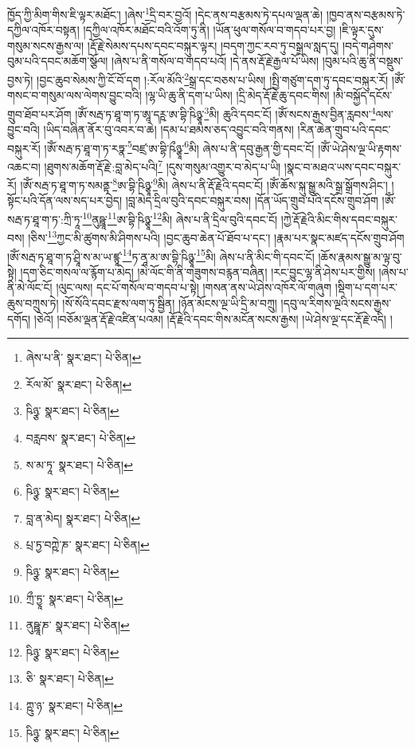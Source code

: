 ཁྱོད་ཀྱི་མིག་གིས་ཇི་ལྟར་མཐོང་། །ཞེས་\footnote{ཞེས་པ་ནི་  སྣར་ཐང་།  པེ་ཅིན། }དྲི་བར་བྱའོ། །དེང་ནས་བརྩམས་ཏེ་དཔལ་ལྡན་ཆེ། །ཁྱབ་ནས་བརྩམས་ཏེ་དཀྱིལ་འཁོར་བསྟན། །དཀྱིལ་འཁོར་མཐོང་བའི་འོག་ཏུ་ནི། །ཡོན་ཕུལ་གསོལ་བ་གདབ་པར་བྱ། །ཇི་ལྟར་དུས་གསུམ་སངས་རྒྱས་ལ། །རྡོ་རྗེ་སེམས་དཔས་དབང་བསྐུར་ལྟར། །བདག་ཀྱང་རབ་ཏུ་བསྒྲལ་སླད་དུ། །བདེ་གཤེགས་བུམ་པའི་དབང་མཆོག་སྩོལ། །ཞེས་པ་ནི་གསོལ་བ་གདབ་པའོ། །དེ་ནས་རྡོ་རྗེ་རྒྱལ་པོ་ཡིས། །བུམ་པའི་ཆུ་ནི་བསྡུས་བྱས་ཏེ། །བྱང་ཆུབ་སེམས་ཀྱི་ངོ་བོ་དག །:རོལ་མོའི་\footnote{རོལ་མོ་  སྣར་ཐང་།  པེ་ཅིན། }སྒྲ་དང་བཅས་པ་ཡིས། །སྤྱི་གཙུག་དག་ཏུ་དབང་བསྐུར་རོ། །ཨོཾ་གསང་བ་གསུམ་ལས་ལེགས་བྱུང་བའི། །ལྷ་ཡི་ཆུ་ནི་དག་པ་ཡིས། །དྲི་མེད་རྡོ་རྗེ་ཆུ་དབང་གིས། །མི་བསྐྱོད་དངོས་གྲུབ་ཐོབ་པར་ཤོག །ཨོཾ་སརྦ་ཏ་ཐཱ་ག་ཏ་ཨཱ་དཪྵ་ཨ་བྷི་ཥིཉྩཱ་\footnote{ཥིཉྩ་  སྣར་ཐང་།  པེ་ཅིན། }མི། ཆུའི་དབང་ངོ། །ཨོཾ་སངས་རྒྱས་བྱིན་རླབས་\footnote{བརླབས་  སྣར་ཐང་།  པེ་ཅིན། }ལས་བྱུང་བའི། །ཡིད་བཞིན་ནོར་བུ་འབར་བ་ཆེ། །དམ་པ་ཐམས་ཅད་འབྱུང་བའི་གནས། །རིན་ཆེན་གྲུབ་པའི་དབང་བསྐུར་རོ། །ཨོཾ་སརྦ་ཏ་ཐཱ་ག་ཏ་རཏྣ་\footnote{ས་མ་ཏཱ་  སྣར་ཐང་།  པེ་ཅིན། }བཛྲ་ཨ་བྷི་ཥྀཉྩཱ་\footnote{ཥིཉྩ་  སྣར་ཐང་།  པེ་ཅིན། }མི། ཞེས་པ་ནི་དབུ་རྒྱན་གྱི་དབང་ངོ། །ཨོཾ་ཡེ་ཤེས་ལྔ་ཡི་རྟགས་འཆང་བ། །ཐུགས་མཆོག་རྡོ་རྗེ་:བླ་མེད་པའི།\footnote{བླ་ན་མེད།  སྣར་ཐང་།  པེ་ཅིན། } །དུས་གསུམ་འགྱུར་བ་མེད་པ་ཡི། །སྣང་བ་མཐའ་ཡས་དབང་བསྐུར་རོ། །ཨོཾ་སརྦ་ཏ་ཐཱ་ག་ཏ་སམནྟ་\footnote{པྲ་ཏྱ་བཀྵེ་ཎ་  སྣར་ཐང་།  པེ་ཅིན། }ཨ་བྷི་ཥིཉྩཱ་\footnote{ཥིཉྩ་  སྣར་ཐང་།  པེ་ཅིན། }མི། ཞེས་པ་ནི་རྡོ་རྗེའི་དབང་ངོ། །ཨོཾ་ཆོས་སྐུ་སྒྱུ་མའི་སྒྲ་སྒྲོགས་ཤིང་། །སྟོང་པའི་དོན་ལས་སད་པར་བྱེད། །བླ་མེད་དྲིལ་བུའི་དབང་བསྐུར་བས། །དོན་ཡོད་གྲུབ་པའི་དངོས་གྲུབ་ཤོག །ཨོཾ་སརྦ་ཏ་ཐཱ་ག་ཏ་:ཀྲི་ཏཱ་\footnote{ཀྲྀ་ཏྱཱ་  སྣར་ཐང་།  པེ་ཅིན། }ནུཥྛཱ་\footnote{ནུཥྛཱ་ཎ་  སྣར་ཐང་།  པེ་ཅིན། }ཨ་བྷི་ཥིཉྩཱ་\footnote{ཥིཉྩ་  སྣར་ཐང་།  པེ་ཅིན། }མི། ཞེས་པ་ནི་དྲིལ་བུའི་དབང་ངོ། །ཀྱེ་རྡོ་རྗེའི་མིང་གིས་དབང་བསྐུར་བས། །ཅིས་\footnote{ཅི་  སྣར་ཐང་།  པེ་ཅིན། }ཀྱང་མི་ཚུགས་མི་ཤིགས་པའི། །བྱང་ཆུབ་ཆེན་པོ་ཐོབ་པ་དང་། །རྣམ་པར་སྣང་མཛད་དངོས་གྲུབ་ཤོག །ཨོཾ་སརྦ་ཏ་ཐཱ་ག་ཏ་ཤྲཱི་ས་མ་ཡ་ཛྙཱ་\footnote{ཀྵུ་ཉ་  སྣར་ཐང་།  པེ་ཅིན། }ཏ་ནཱ་མ་ཨ་བྷི་ཥིཉྩཱ་\footnote{ཥིཉྩ་  སྣར་ཐང་།  པེ་ཅིན། }མི། ཞེས་པ་ནི་མིང་གི་དབང་ངོ། །ཆོས་རྣམས་སྒྱུ་མ་ལྟ་བུ་སྟེ། །དག་ཅིང་གསལ་ལ་རྙོག་པ་མེད། །མེ་ལོང་གི་ནི་གཟུགས་བརྙན་བཞིན། །རང་བྱུང་ལྷ་ནི་ཤེས་པར་གྱིས། །ཞེས་པ་ནི་མེ་ལོང་ངོ། །ལུང་ལས། དང་པོ་གསོལ་བ་གདབ་པ་སྟེ། །གསན་ནས་ཡེ་ཤེས་འཁོར་ལོ་གཞུག །སྡིག་པ་དག་པར་ཆུས་བཀྲུས་ཏེ། །སོ་སོའི་དབང་རྫས་ལག་ཏུ་སྦྱིན། །ཉོན་མོངས་ལྔ་ཡི་དྲི་མ་བཀྲུ། །དབུ་ལ་རིགས་ལྔའི་སངས་རྒྱས་དགོད། །ཅེའོ། །བཅོམ་ལྡན་རྡོ་རྗེ་འཛིན་པའམ། །རྡོ་རྗེའི་དབང་གིས་མངོན་སངས་རྒྱས། །ཡེ་ཤེས་ལྔ་དང་རྡོ་རྗེ་འདི། །
